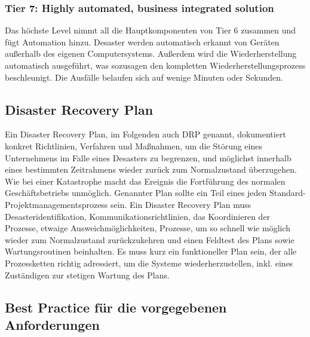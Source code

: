 \documentclass[letterpaper, 12pt]{article}
\let\tempsubsection\subsection
\renewcommand\subsection[1]{\vspace{0cm}\tempsubsection{#1}\vspace{0cm}}
\let\tempsubsubsection\subsubsection
\renewcommand\subsubsection[1]{\vspace{0cm}\tempsubsubsection{#1}\vspace{0cm}}
\begin{document}
\subsubsection{Tier 7: Highly automated, business integrated solution}

Das höchste Level nimmt all die Hauptkomponenten von Tier 6 zusammen und fügt Automation hinzu. Desaster werden automatisch erkannt von Geräten außerhalb des eigenen Computersystems.
Außerdem wird die Wiederherstellung automatisch ausgeführt, was sozusagen den kompletten
Wiederherstellungsprozess beschleunigt. Die Ausfälle
belaufen sich auf wenige Minuten oder Sekunden. \cite{ausarbeitungdis}

\clearpage

\subsection{Disaster Recovery Plan}

Ein Disaster Recovery Plan, im Folgenden auch DRP genannt, dokumentiert
konkret Richtlinien, Verfahren und Maßnahmen, um die Störung eines Unternehmens im Falle eines
Desasters zu begrenzen, und möglichst innerhalb eines bestimmten Zeitrahmens wieder zurück
zum Normalzustand überzugehen. Wie bei einer Katastrophe macht das Ereignis die Fortführung
des normalen Geschäftsbetriebs unmöglich. Genannter Plan sollte ein Teil eines jeden Standard-
Projektmanagementsprozess sein. Ein Disaster Recovery Plan muss Desasteridentifikation, Kommunikationsrichtlinien, das Koordinieren
der Prozesse, etwaige Ausweichmöglichkeiten, Prozesse, um so schnell wie möglich wieder
zum Normalzustand zurückzukehren und einen Feldtest des Plans sowie Wartungsroutinen beinhalten.
Es muss kurz ein funktioneller Plan sein, der alle Prozessketten richtig adressiert, um die
Systeme wiederherzustellen, inkl. eines Zuständigen zur stetigen Wartung des Plans. \cite{ausarbeitungdis}

\subsection{Best Practice für die vorgegebenen Anforderungen}
\end{document}
